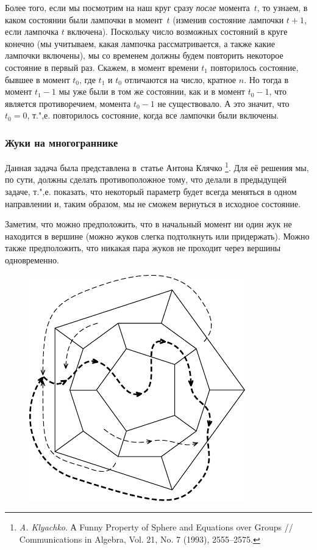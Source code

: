 \documentclass[twoside]{book}
\begin{document}
Более того, если мы посмотрим на наш круг сразу \emph{после} момента~$t$, то узнаем, в каком состоянии были лампочки в момент~$t$ (изменив состояние лампочки $t+1$, если лампочка $t$ включена).
Поскольку число возможных состояний в круге конечно (мы учитываем, какая лампочка рассматривается, а также какие лампочки включены),  мы со временем должны будем повторить некоторое состояние в первый раз.
Скажем, в момент времени $t_1$ повторилось состояние, бывшее в момент $t_0$, где $t_1$ и $t_0$ отличаются на число, кратное $n$.
Но тогда в момент $t_1 - 1$ мы уже были в том же состоянии, как и в момент $t_0 - 1$, что является противоречием,  момента $t_0 - 1$ не существовало.
А это значит, что $t_0=0$, т.",е. повторилось состояние, когда все лампочки были включены.
\heart

\subsubsection*{Жуки на многограннике}%

Данная задача была представлена в~статье Антона Клячко%
\footnote{\emph{A. Klyachko}. А Funny Property of Sphere and Equations over Groups /\!/ {Com\-mu\-ni\-ca\-tions in Algebra}, Vol. 21, No. 7 (1993), 2555--2575.}. 
Для её решения мы, по сути, должны сделать противоположное тому, что делали в предыдущей задаче, т.",е. показать, что некоторый параметр будет всегда меняться в одном направлении и, таким образом, мы не сможем вернуться в исходное состояние.

\medskip

Заметим, что можно предположить, что в начальный момент ни один жук не находится в вершине (можно жуков слегка подтолкнуть или придержать).
Можно также предположить, что никакая пара жуков не проходит через вершины одновременно.

\begin{figure}[!ht]
\centering
\includegraphics{mp/wink-22}
\end{figure}
\end{document}
